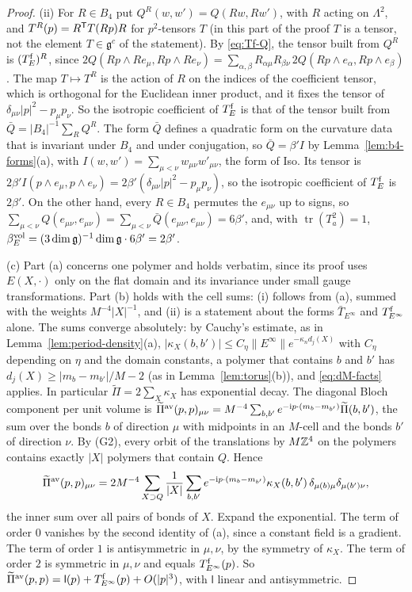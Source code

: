 \begin{proof}
(ii) For $R\in B_4$ put $Q^R(w,w')=Q(Rw,Rw')$, with $R$ acting on $\Lambda^2$, and $T^R(p)=R^{\sf T}T(Rp)R$ for $p^2$-tensors $T$ (in this part of the proof $T$ is a tensor, not the element $T\in\mathfrak g^c$ of the statement). By \eqref{eq:Tf-Q}, the tensor built from $Q^R$ is $(T^{\rm f}_E)^R$, since $2Q(Rp\wedge Re_\mu,Rp\wedge Re_\nu)=\sum_{\alpha,\beta}R_{\alpha\mu}R_{\beta\nu}\,2Q(Rp\wedge e_\alpha,Rp\wedge e_\beta)$. The map $T\mapsto T^R$ is the action of $R$ on the indices of the coefficient tensor, which is orthogonal for the Euclidean inner product, and it fixes the tensor of $\delta_{\mu\nu}|p|^2-p_\mu p_\nu$. So the isotropic coefficient of $T^{\rm f}_E$ is that of the tensor built from $\bar Q=|B_4|^{-1}\sum_RQ^R$. The form $\bar Q$ defines a quadratic form on the curvature data that is invariant under $B_4$ and under conjugation, so $\bar Q=\beta'I$ by Lemma~\ref{lem:b4-forms}(a), with $I(w,w')=\sum_{\mu<\nu}w_{\mu\nu}w'_{\mu\nu}$, the form of Iso. Its tensor is $2\beta'I(p\wedge e_\mu,p\wedge e_\nu)=2\beta'(\delta_{\mu\nu}|p|^2-p_\mu p_\nu)$, so the isotropic coefficient of $T^{\rm f}_E$ is $2\beta'$. On the other hand, every $R\in B_4$ permutes the $e_{\mu\nu}$ up to signs, so $\sum_{\mu<\nu}Q(e_{\mu\nu},e_{\mu\nu})=\sum_{\mu<\nu}\bar Q(e_{\mu\nu},e_{\mu\nu})=6\beta'$, and, with $\operatorname{tr}(T_a^2)=1$, $\beta^{\rm vol}_E=(3\dim\mathfrak g)^{-1}\dim\mathfrak g\cdot6\beta'=2\beta'$.

(c) Part (a) concerns one polymer and holds verbatim, since its proof uses $E(X,\cdot)$ only on the flat domain and its invariance under small gauge transformations. Part (b) holds with the cell sums: (i) follows from (a), summed with the weights $M^{-4}|X|^{-1}$, and (ii) is a statement about the forms $\bar T_{E^\infty}$ and $T^{\rm f}_{E^\infty}$ alone. The sums converge absolutely: by Cauchy's estimate, as in Lemma~\ref{lem:period-density}(a), $|\kappa_X(b,b')|\le C_\eta\|E^\infty\|e^{-\kappa_nd_j(X)}$ with $C_\eta$ depending on $\eta$ and the domain constants, a polymer that contains $b$ and $b'$ has $d_j(X)\ge|m_b-m_{b'}|/M-2$ (as in Lemma~\ref{lem:torus}(b)), and \eqref{eq:dM-facts} applies. In particular $\widetilde\Pi=2\sum_X\kappa_X$ has exponential decay. The diagonal Bloch component per unit volume is $\widetilde\Pi^{\rm av}(p,p)_{\mu\nu}=M^{-4}\sum_{b,b'}e^{-\mathrm i p\cdot(m_b-m_{b'})}\widetilde\Pi(b,b')$, the sum over the bonds $b$ of direction $\mu$ with midpoints in an $M$-cell and the bonds $b'$ of direction $\nu$. By (G2), every orbit of the translations by $M\mathbb Z^4$ on the polymers contains exactly $|X|$ polymers that contain $Q$. Hence
\[
\widetilde\Pi^{\rm av}(p,p)_{\mu\nu}=2M^{-4}\sum_{X\supset Q}\frac1{|X|}\sum_{b,b'}e^{-\mathrm i p\cdot(m_b-m_{b'})}\kappa_X(b,b')\,\delta_{\mu(b)\mu}\delta_{\mu(b')\nu},
\]
the inner sum over all pairs of bonds of $X$.
Expand the exponential. The term of order $0$ vanishes by the second identity of (a), since a constant field is a gradient. The term of order $1$ is antisymmetric in $\mu,\nu$, by the symmetry of $\kappa_X$. The term of order $2$ is symmetric in $\mu,\nu$ and equals $T^{\rm f}_{E^\infty}(p)$. So $\widetilde\Pi^{\rm av}(p,p)=\mathsf l(p)+T^{\rm f}_{E^\infty}(p)+O(|p|^3)$, with $\mathsf l$ linear and antisymmetric.


\end{proof}
